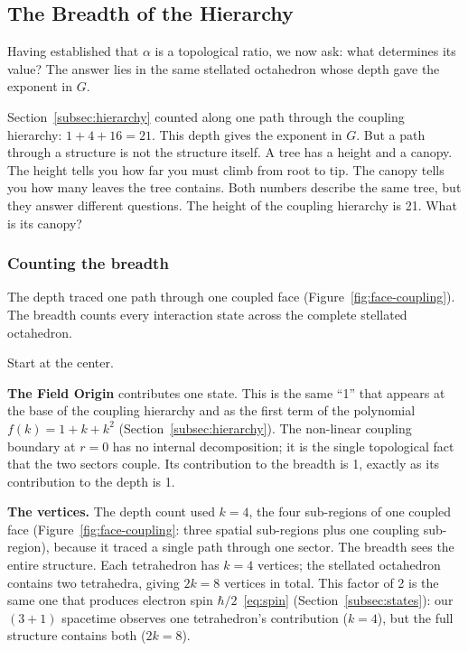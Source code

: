 \documentclass[aps,prd,preprint,superscriptaddress,showpacs,preprintnumbers,amsmath,amssymb,nofootinbib]{revtex4-2}
\begin{document}
\subsection{The Breadth of the Hierarchy}
\label{subsec:breadth}

Having established that $\alpha$ is a topological ratio, we now ask: what determines its value? The answer lies in the same stellated octahedron whose depth gave the exponent in $G$.

Section~\ref{subsec:hierarchy} counted along one path through the coupling hierarchy: $1 + 4 + 16 = 21$. This depth gives the exponent in $G$. But a path through a structure is not the structure itself. A tree has a height and a canopy. The height tells you how far you must climb from root to tip. The canopy tells you how many leaves the tree contains. Both numbers describe the same tree, but they answer different questions. The height of the coupling hierarchy is 21. What is its canopy?

\subsubsection*{Counting the breadth}

The depth traced one path through one coupled face (Figure~\ref{fig:face-coupling}). The breadth counts every interaction state across the complete stellated octahedron.

Start at the center.

\textbf{The Field Origin} contributes one state. This is the same ``1'' that appears at the base of the coupling hierarchy and as the first term of the polynomial $f(k) = 1 + k + k^2$ (Section~\ref{subsec:hierarchy}). The non-linear coupling boundary at $r = 0$ has no internal decomposition; it is the single topological fact that the two sectors couple. Its contribution to the breadth is 1, exactly as its contribution to the depth is 1.

\textbf{The vertices.} The depth count used $k = 4$, the four sub-regions of one coupled face (Figure~\ref{fig:face-coupling}: three spatial sub-regions plus one coupling sub-region), because it traced a single path through one sector. The breadth sees the entire structure. Each tetrahedron has $k = 4$ vertices; the stellated octahedron contains two tetrahedra, giving $2k = 8$ vertices in total. This factor of 2 is the same one that produces electron spin $\hbar/2$~\eqref{eq:spin} (Section~\ref{subsec:states}): our $(3+1)$ spacetime observes one tetrahedron's contribution ($k = 4$), but the full structure contains both ($2k = 8$).
\end{document}
